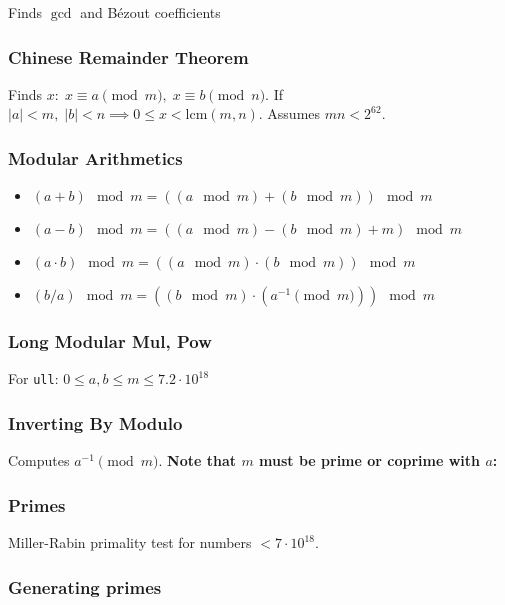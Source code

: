 Finds $\gcd$ and Bézout coefficients

\subsubsection{Chinese Remainder Theorem}

Finds $x:\; x \equiv a \pmod{m},\; x \equiv b \pmod{n}$. If $|a| < m,\; |b| < n \implies 0 \le x < \text{lcm}(m,n)$. Assumes $mn < 2^{62}$.

\subsubsection{Modular Arithmetics}

\vspace{1em}
\begin{itemize}
  \item $(a + b) \mod m = ((a \mod m) + (b \mod m)) \mod m$
  \item $(a - b) \mod m = ((a \mod m) - (b \mod m) + m) \mod m$
  \item $(a \cdot b) \mod m = ((a \mod m) \cdot (b \mod m)) \mod m$
  \item $(b / a) \mod m = ((b \mod m) \cdot (a^{-1} \pmod m)) \mod m$
\end{itemize}

\subsubsection{Long Modular Mul, Pow}
For \verb|ull|: $0 \le a, b \le m \le 7.2 \cdot 10^{18}$

\subsubsection{Inverting By Modulo}

Computes $a^{-1} \pmod m$. \bf{Note that $m$ must be prime or coprime with $a$}:

\subsubsection{Primes}

Miller-Rabin primality test for numbers $< 7 \cdot 10^{18}$. 

\subsubsection{Generating primes}

